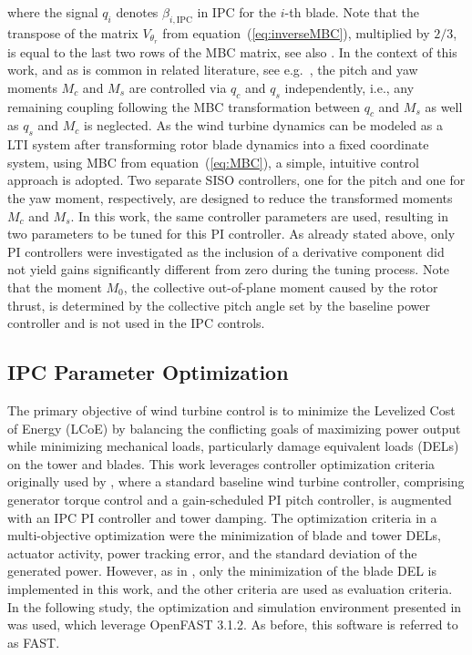 where the signal $q_i$ denotes $\beta_{i,\text{IPC}}$ in IPC for the $i$-th blade. %
Note that the transpose of the matrix $V_{\theta_{r}}$ from equation~(\ref{eq:inverseMBC}), multiplied by $2/3$, is equal to the last two rows of the MBC matrix, see also \cite{ossmann2017load}. In the context of this work, and as is common in related literature, see e.g.~\cite{he2018combined}, the pitch and yaw moments $M_c$ and $M_s$ are controlled via $q_c$ and $q_s$ independently, i.e., any remaining coupling following the MBC transformation between $q_c$ and $M_s$ as well as $q_s$ and $M_c$ is neglected. As the wind turbine dynamics can be modeled as a LTI system after transforming rotor blade dynamics into a fixed coordinate system, using MBC from equation~(\ref{eq:MBC}), a simple, intuitive control approach is adopted. Two separate SISO controllers, one for the pitch and one for the yaw moment, respectively, are designed to reduce the transformed moments $M_c$ and $M_s$. In this work, the same controller parameters are used, resulting in two parameters to be tuned for this PI controller. As already stated above, only PI controllers were investigated as the inclusion of a derivative component did not yield gains significantly different from zero during the tuning process. Note that the moment $M_0$, the collective out-of-plane moment caused by the rotor thrust, is determined by the collective pitch angle set by the baseline power controller and is not used in the IPC controls.

\subsection{IPC Parameter Optimization} \label{subsection: IPCOptCriteria}
The primary objective of wind turbine control is to minimize the Levelized Cost of Energy (LCoE) by balancing the conflicting goals of maximizing power output while minimizing mechanical loads, particularly damage equivalent loads (DELs) on the tower and blades. This work leverages controller optimization criteria originally used by \cite{hoffmann2018load}, where a standard baseline wind turbine controller, comprising generator torque control and a gain-scheduled PI pitch controller, is augmented with an IPC PI controller and tower damping. The optimization criteria in a multi-objective optimization were the minimization of blade and tower DELs, actuator activity, power tracking error, and the standard deviation of the generated power. However, as in \cite{dittmer2024combined}, only the minimization of the blade DEL is implemented in this work, and the other criteria are used as evaluation criteria. In the following study, the optimization and simulation environment presented in \cite{dittmer2024combined} was used, which leverage OpenFAST 3.1.2. As before, this software is referred to as FAST.

